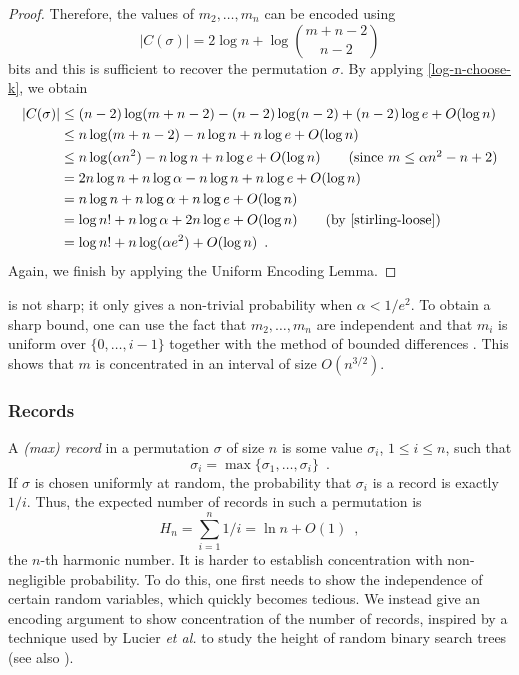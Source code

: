 \documentclass[prodmode,acmcsur]{acmsmall}
\begin{document}
\begin{proof}
  Therefore, the values of $m_2,\ldots,m_n$ can be encoded using
  \[
    |C(\sigma)| = 2\log n + \log\binom{m+n-2}{n-2}
  \]
  bits and this is sufficient to recover the permutation $\sigma$.  By
  applying \eqref{log-n-choose-k}, we obtain
  \begin{align*}
    |C(\sigma)| & \le (n-2)\log(m+n-2) - (n-2)\log(n-2)  + (n-2)\log e + O(\log n) \\
      & \le n\log(m+n-2) - n\log n   + n\log e + O(\log n) \\
      & \le n\log(\alpha n^2) - n\log n  + n\log e + O(\log n) \tag{since $m \le \alpha n^2 - n + 2$}\\
      & = 2n\log n + n\log\alpha - n\log n  + n\log e + O(\log n) \\
      & = n\log n + n\log\alpha + n\log e + O(\log n) \\
      & = \log n! + n\log\alpha + 2n\log e + O(\log n) \tag{by \eqref{stirling-loose}} \\
      & = \log n! + n \log (\alpha e^2) + O(\log n) \enspace .
  \end{align*}
  Again, we finish by applying the Uniform Encoding Lemma.
\end{proof}


\begin{rem}
   is not sharp; it only gives a non-trivial
  probability when $\alpha < 1/e^2$.  To obtain a sharp bound, one can
  use the fact that $m_2,\ldots,m_n$ are independent and that $m_i$ is
  uniform over $\{0,\ldots,i-1\}$ together with the method of bounded
  differences \cite{mcdiarmid:on}. This shows that $m$ is concentrated in
  an interval of size $O(n^{3/2})$.
\end{rem}

\subsubsection{Records}

A \emph{(max) record} in a permutation $\sigma$ of size
$n$ is some value $\sigma_i$, $1 \leq i \leq n$, such that
\[
  \sigma_i = \max\{\sigma_1, \dots, \sigma_i\} \enspace .
\]
If $\sigma$ is chosen uniformly at random, the probability that 
$\sigma_i$ is a record is exactly $1/i$. Thus, 
the expected number of records in such a permutation is
\[
  H_n = \sum_{i = 1}^n 1/i = \ln n + O(1) \enspace ,
\]
the $n$-th harmonic number. It is harder to establish concentration
with non-negligible probability. To do this, one first needs to show
the independence of certain random variables, which quickly becomes
tedious. We instead give an encoding argument to show concentration of
the number of records, inspired by a technique used by Lucier \emph{et
  al.} to study the height of random binary search trees
\cite{lucier.jiang.li:quicksort} (see also ).
\end{document}
